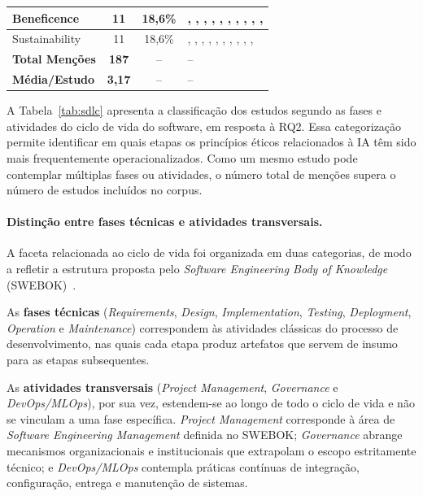 \begin{table}[htbp]
\begin{tabular}{lccp{6.5cm}}
\hline
Beneficence & 11 & 18,6\% & \cite{S001}, \cite{S012}, \cite{S016}, \cite{S019}, \cite{S023}, \cite{S027}, \cite{S028}, \cite{S029}, \cite{S042}, \cite{S047}, \cite{S058} \\
\hline
Sustainability & 11 & 18,6\% & \cite{S005}, \cite{S012}, \cite{S016}, \cite{S023}, \cite{S026}, \cite{S028}, \cite{S030}, \cite{S033}, \cite{S040}, \cite{S042}, \cite{S051} \\
\hline
\textbf{Total Menções} & \textbf{187} & -- & -- \\
\textbf{Média/Estudo} & \textbf{3,17} & -- & -- \\
\hline
\end{tabular}
\end{table}

A Tabela~\ref{tab:sdlc} apresenta a classificação dos estudos segundo as fases e atividades do ciclo de vida do software, em resposta à RQ2. Essa categorização permite identificar em quais etapas os princípios éticos relacionados à IA têm sido mais frequentemente operacionalizados. Como um mesmo estudo pode contemplar múltiplas fases ou atividades, o número total de menções supera o número de estudos incluídos no corpus.

\paragraph*{Distinção entre fases técnicas e atividades transversais.}

A faceta relacionada ao ciclo de vida foi organizada em duas categorias, de modo a refletir a estrutura proposta pelo \textit{Software Engineering Body of Knowledge} (SWEBOK)~\cite{SWEBOK2014}.

As \textbf{fases técnicas} (\textit{Requirements}, \textit{Design}, \textit{Implementation}, \textit{Testing}, \textit{Deployment}, \textit{Operation} e \textit{Maintenance}) correspondem às atividades clássicas do processo de desenvolvimento, nas quais cada etapa produz artefatos que servem de insumo para as etapas subsequentes.

As \textbf{atividades transversais} (\textit{Project Management}, \textit{Governance} e \textit{DevOps/MLOps}), por sua vez, estendem-se ao longo de todo o ciclo de vida e não se vinculam a uma fase específica. \textit{Project Management} corresponde à área de \textit{Software Engineering Management} definida no SWEBOK; \textit{Governance} abrange mecanismos organizacionais e institucionais que extrapolam o escopo estritamente técnico; e \textit{DevOps/MLOps} contempla práticas contínuas de integração, configuração, entrega e manutenção de sistemas.

